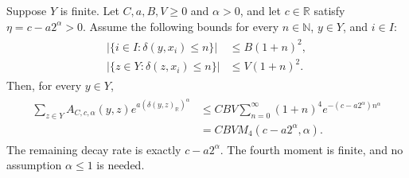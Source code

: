\begin{theorem}
    \label{thm:stretched_ball_weighted_row}
    \leanok
    Suppose $Y$ is finite.  Let $C,a,B,V\geq0$ and $\alpha>0$,
    and let $c\in\mathbb R$ satisfy $\eta=c-a2^\alpha>0$.
    Assume the following bounds for every $n\in\mathbb N$,
    $y\in Y$, and $i\in I$:
    \begin{align}
        \begin{aligned}
            \bigl|\{i\in I:\delta(y,x_i)\leq n\}\bigr| & \leq B(1+n)^2, \\
            \bigl|\{z\in Y:\delta(z,x_i)\leq n\}\bigr| & \leq V(1+n)^2.
        \end{aligned}
        \label{eq:stretched_ball_counts}
    \end{align}
    Then, for every $y\in Y$,
    \begin{align}
        \begin{aligned}
            \sum_{z\in Y}A_{C,c,\alpha}(y,z)
            e^{a(\delta(y,z)_{\mathbb R})^\alpha}
             & \leq CBV\sum_{n=0}^{\infty}(1+n)^4
            e^{-(c-a2^\alpha)n^\alpha}            \\
             & =CBV M_4(c-a2^\alpha,\alpha).
        \end{aligned}
        \label{eq:stretched_ball_weighted_row}
    \end{align}
    The remaining decay rate is exactly $c-a2^\alpha$.
    The fourth moment is finite, and no assumption $\alpha\leq1$
    is needed.
\end{theorem}
